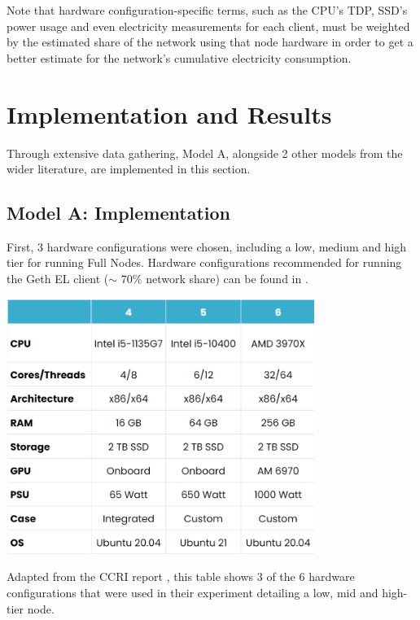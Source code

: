 Note that hardware configuration-specific terms, such as the CPU's TDP, SSD's power usage and even electricity measurements for each client, must be weighted by the estimated share of the network using that node hardware in order to get a better estimate for the network's cumulative electricity consumption. 


\section{Implementation and Results}
\label{ImplementationSection}
Through extensive data gathering, Model A, alongside 2 other models from the wider literature, are implemented in this section.


\subsection{Model A: Implementation}

First, 3 hardware configurations were chosen, including a low, medium and high tier for running Full Nodes. Hardware configurations recommended for running the Geth EL client ($\sim$ 70\% network share) can be found in .

\begin{table}[htb!]
    \centering
    \includegraphics[width=10cm,center]{Figures/CCRIhardwareConfigEdit.png}
    \caption{Adapted from the CCRI report \cite{CryptoCarbonRatingsInstitute2022TheNetwork}, this table shows 3 of the 6 hardware configurations that were used in their experiment detailing a low, mid and high-tier node.}
    \label{Table:CCRIhardwareConfig}
\end{table}

